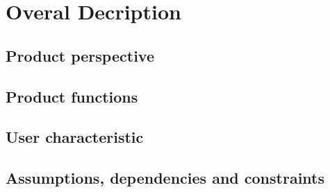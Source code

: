 \section{Overal Decription}

\subsection{Product perspective}


\subsection{Product functions}


\subsection{User characteristic}


\subsection{Assumptions, dependencies and constraints}


